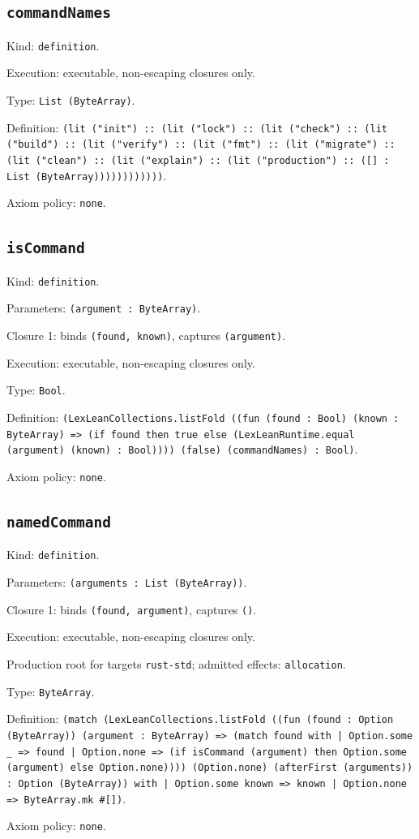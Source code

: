 \documentclass[11pt]{article}
\begin{document}
\subsection*{\texttt{commandNames}}
\noindent Kind: \texttt{definition}.\par
\noindent Execution: executable, non-escaping closures only.\par
\noindent Type: \texttt{List (ByteArray)}.\par
\noindent Definition: \texttt{(lit ("init") :: (lit ("lock") :: (lit ("check") :: (lit ("build") :: (lit ("verify") :: (lit ("fmt") :: (lit ("migrate") :: (lit ("clean") :: (lit ("explain") :: (lit ("production") :: ([] : List (ByteArray))))))))))))}.\par
\noindent Axiom policy: \texttt{none}.\par
\subsection*{\texttt{isCommand}}
\noindent Kind: \texttt{definition}.\par
\noindent Parameters: \texttt{(argument : ByteArray)}.\par
\noindent Closure 1: binds \texttt{(found, known)}, captures \texttt{(argument)}.\par
\noindent Execution: executable, non-escaping closures only.\par
\noindent Type: \texttt{Bool}.\par
\noindent Definition: \texttt{(LexLeanCollections.listFold ((fun (found : Bool) (known : ByteArray) => (if found then true else (LexLeanRuntime.equal (argument) (known) : Bool)))) (false) (commandNames) : Bool)}.\par
\noindent Axiom policy: \texttt{none}.\par
\subsection*{\texttt{namedCommand}}
\noindent Kind: \texttt{definition}.\par
\noindent Parameters: \texttt{(arguments : List (ByteArray))}.\par
\noindent Closure 1: binds \texttt{(found, argument)}, captures \texttt{()}.\par
\noindent Execution: executable, non-escaping closures only.\par
\noindent Production root for targets \texttt{rust-std}; admitted effects: \texttt{allocation}.\par
\noindent Type: \texttt{ByteArray}.\par
\noindent Definition: \texttt{(match (LexLeanCollections.listFold ((fun (found : Option (ByteArray)) (argument : ByteArray) => (match found with | Option.some \_ => found | Option.none => (if isCommand (argument) then Option.some (argument) else Option.none)))) (Option.none) (afterFirst (arguments)) : Option (ByteArray)) with | Option.some known => known | Option.none => ByteArray.mk \#[])}.\par
\noindent Axiom policy: \texttt{none}.\par
\end{document}
